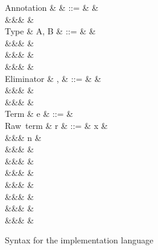 \begin{figure}
\begin{syntaxfig}
\mbox{Annotation}
&
\alpha
&
::=
&
\true
&
\\
&&&
\false
&
\\[2mm]
\mbox{Type}
&
A, B
&
::=
&
\tyInt
&
\\
&&&
\tyList
&
\\
&&&
&
\\
&&&
&
\\[2mm]
\mbox{Eliminator}
&
\sigma, \tau
&
::=
&
&
\\
&&&
&
\\
&&&
&
\\[2mm]
\mbox{Term}
&
e
&
::=
&
\\[2mm]
\mbox{Raw term}
&
r
&
::=
&
x
&
\\
&&&
n
&
\\
&&&
&
\\
&&&
&
\\
&&&
&
\\
&&&
&
\\
&&&
\exNil
&
\\
&&&
&
\\
&&&
&
\end{syntaxfig}
\caption{Syntax for the implementation language}
\label{fig:impl-language:syntax}
\end{figure}
